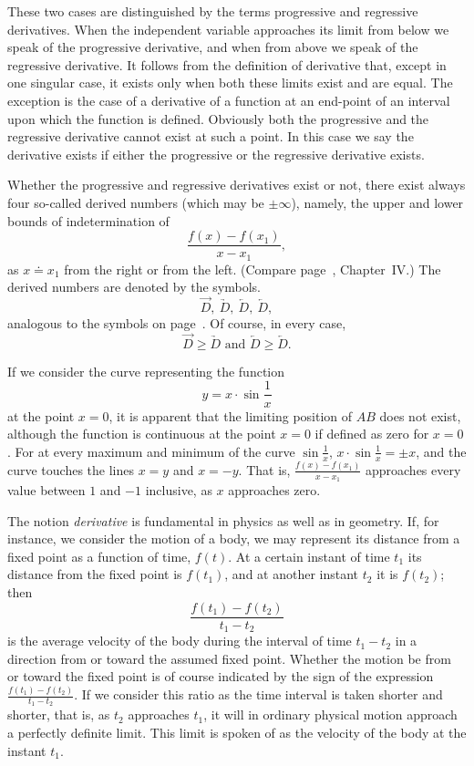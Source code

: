 \documentclass[a4paper,12pt]{book}[2004/02/16]
\providecommand{\geqq}{\geq}
\providecommand{\hyperlink}[2]{#2}
\theoremstyle{ilemma}
\theoremstyle{itheorem}
\theoremstyle{iother}
\theoremstyle{icorollary}
\theoremstyle{numcorollary}
\theoremstyle{idefinition}
\renewcommand{\dfrac}[2]{\frac{#1}{#2}}%
\begin{document}
These two cases are distinguished by the terms progressive
and regressive derivatives. When the independent variable
approaches its limit from below we speak of the progressive
derivative, and when from above we speak of the regressive
derivative. It follows from the definition of derivative that,
except in one singular case, it exists only when both these
limits exist and are equal. The exception is the case of a
derivative of a function at an end-point of an interval upon
which the function is defined. Obviously both the progressive
and the regressive derivative cannot exist at such a point. In
this case we say the derivative exists if either the progressive or
the regressive derivative exists.

Whether the progressive and regressive derivatives exist or not, there
exist always four so-called derived numbers (which may be
$\pm\infty$), namely, the upper and lower bounds of indetermination of
\[
  \frac{f(x)-f(x_1)}{x-x_1},
\]
as $x \doteq x_1$ from the right or from the left. (Compare
page~\pageref{limp84}, Chapter~\hyperlink{chapIV}{IV}.) The derived numbers are denoted by
the symbols.
\[
  \overrightarrow{D},\ \underrightarrow{D},\
  \overleftarrow{D},\ \underleftarrow{D},
\]
analogous to the symbols on page~\pageref{limp84}. Of course, in every
case,
\[
  \overrightarrow{D}\geqq \underrightarrow{D} \text{ and }
  \overleftarrow{D} \geqq \underleftarrow{D}.
\]

If we consider the curve representing the function
\[
  y=x \cdot \sin \frac1x
\]
at the point $x=0$, it is apparent that the limiting position of $AB$
does not exist, although the function is continuous at the point $x=0$
if defined as zero for $x=0$. For at every maximum and minimum of the
curve $\sin\dfrac{1}{x}$, $x \cdot \sin\dfrac{1}{x} = \pm x$, and the
curve touches the lines $x=y$ and $x=-y$. That is,
$\dfrac{f(x)-f(x_1)}{x-x_1}$ approaches every value between $1$ and
$-1$ inclusive, as $x$ approaches zero.

The notion \textit{derivative} is fundamental in physics as well as in
geometry. If, for instance, we consider the motion of a body, we may
represent its distance from a fixed point as a function of time,
$f(t)$. At a certain instant of time $t_1$ its distance from the fixed
point is $f(t_1)$, and at another instant $t_2$ it is $f(t_2)$; then
\[
  \frac{f(t_1)-f(t_2)}{t_1-t_2}
\]
is the average velocity of the body during the interval of time
$t_1-t_2$ in a direction from or toward the assumed fixed point.
Whether the motion be from or toward the fixed point is of course
indicated by the sign of the expression
$\dfrac{f(t_1)-f(t_2)}{t_1-t_2}$.  If we consider this ratio as the
time interval is taken shorter and shorter, that is, as $t_2$
approaches $t_1$, it will in ordinary physical motion approach a
perfectly definite limit. This limit is spoken of as the velocity of
the body at the instant $t_1$.
\end{document}
